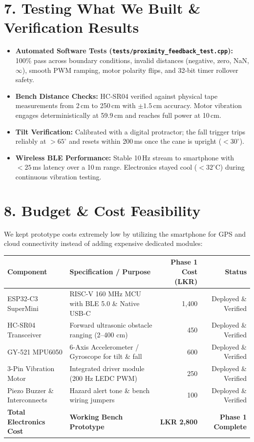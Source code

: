 \documentclass[10pt,a4paper]{article}
\begin{document}
\section{7. Testing What We Built \& Verification Results}
\begin{itemize}
    \item \textbf{Automated Software Tests (\texttt{tests/proximity\_feedback\_test.cpp}):} 100\% pass across boundary conditions, invalid distances (negative, zero, NaN, $\infty$), smooth PWM ramping, motor polarity flips, and 32-bit timer rollover safety.
    \item \textbf{Bench Distance Checks:} HC-SR04 verified against physical tape measurements from 2\,cm to 250\,cm with $\pm 1.5$\,cm accuracy. Motor vibration engages deterministically at 59.9\,cm and reaches full power at 10\,cm.
    \item \textbf{Tilt Verification:} Calibrated with a digital protractor; the fall trigger trips reliably at $>65^\circ$ and resets within 200\,ms once the cane is upright ($<30^\circ$).
    \item \textbf{Wireless BLE Performance:} Stable 10\,Hz stream to smartphone with $<25$\,ms latency over a 10\,m range. Electronics stayed cool ($<32^\circ$C) during continuous vibration testing.
\end{itemize}

\section{8. Budget \& Cost Feasibility}
We kept prototype costs extremely low by utilizing the smartphone for GPS and cloud connectivity instead of adding expensive dedicated modules:
\begin{center}
\small
\begin{tabularx}{\textwidth}{lXrr}
\toprule
\textbf{Component} & \textbf{Specification / Purpose} & \textbf{Phase 1 Cost (LKR)} & \textbf{Status} \\
\midrule
ESP32-C3 SuperMini & RISC-V 160 MHz MCU with BLE 5.0 \& Native USB-C & 1,400 & Deployed \& Verified \\
HC-SR04 Transceiver & Forward ultrasonic obstacle ranging (2--400 cm) & 450 & Deployed \& Verified \\
GY-521 MPU6050 & 6-Axis Accelerometer / Gyroscope for tilt \& fall & 600 & Deployed \& Verified \\
3-Pin Vibration Motor & Integrated driver module (200 Hz LEDC PWM) & 250 & Deployed \& Verified \\
Piezo Buzzer \& Interconnects & Hazard alert tone \& bench wiring jumpers & 100 & Deployed \& Verified \\
\midrule
\textbf{Total Electronics Cost} & \textbf{Working Bench Prototype} & \textbf{LKR 2,800} & \textbf{Phase 1 Complete} \\
\bottomrule
\end{tabularx}
\end{center}
\end{document}
